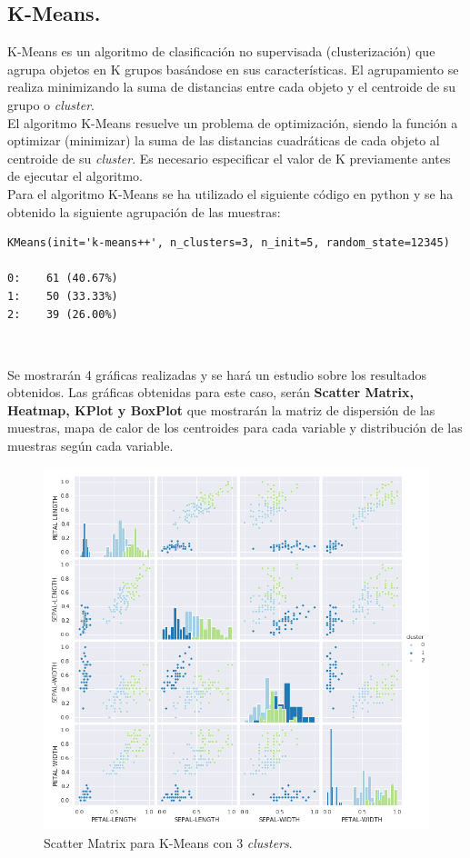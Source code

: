 \documentclass[a4paper, 20pt]{article}
\begin{document}
\subsection{K-Means.}

K-Means es un algoritmo de clasificación no supervisada (clusterización) que agrupa objetos en K grupos basándose en sus características. El agrupamiento se realiza minimizando la suma de distancias entre cada objeto y el centroide de su grupo o \textit{cluster}.\\ 

El algoritmo K-Means resuelve un problema de optimización, siendo la función a optimizar (minimizar) la suma de las distancias cuadráticas de cada objeto al centroide de su \textit{cluster}. Es necesario especificar el valor de K previamente antes de ejecutar el algoritmo.\\

Para el algoritmo K-Means se ha utilizado el siguiente código en python y se ha obtenido la siguiente agrupación de las muestras:\\

\begin{lstlisting}
KMeans(init='k-means++', n_clusters=3, n_init=5, random_state=12345)

0:    61 (40.67%)
1:    50 (33.33%)
2:    39 (26.00%)
\end{lstlisting}\

Se mostrarán 4 gráficas realizadas y se hará un estudio sobre los resultados obtenidos. Las gráficas obtenidas para este caso, serán \textbf{Scatter Matrix, Heatmap, KPlot y BoxPlot} que mostrarán la matriz de dispersión de las muestras, mapa de calor de los centroides para cada variable y distribución de las muestras según cada variable.

\clearpage

\begin{figure}[h]
\centering
\includegraphics[scale=0.62]{dani/scatmatrixK-MeansIRIS.png}
\caption{Scatter Matrix para K-Means con 3 \textit{clusters}.}
\label{smkm}
\end{figure}\
\end{document}
